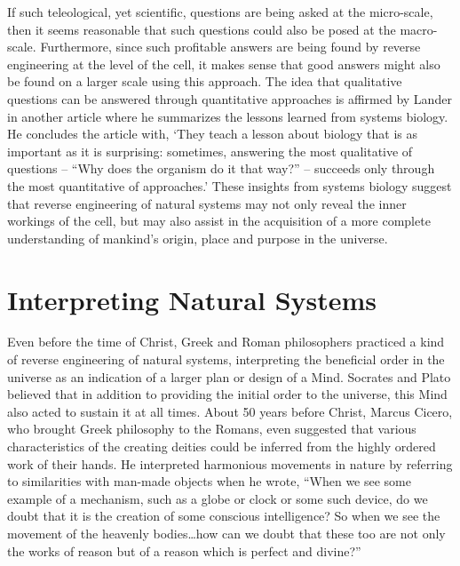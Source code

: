 If such teleological, yet scientific, questions are being asked at the
micro-scale, then it seems reasonable that such questions could also be
posed at the macro-scale. Furthermore, since such profitable answers
are being found by reverse engineering at the level of the cell, it
makes sense that good answers might also be found on a larger scale
using this approach. The idea that qualitative questions can be
answered through quantitative approaches is affirmed by Lander in
another article where he summarizes the lessons learned from systems
biology. He concludes the article with, ‘They teach a lesson about
biology that is as important as it is surprising: sometimes, answering
the most qualitative of questions – “Why does the organism do it that
way?” – succeeds only through the most quantitative of
approaches.’\citep{lander2007} These insights from systems biology
suggest that reverse engineering of natural systems may not only reveal
the inner workings of the cell, but may also assist in the acquisition
of a more complete understanding of mankind’s origin, place and purpose
in the universe.

\section{Interpreting Natural Systems}

Even before the time of Christ, Greek and Roman philosophers practiced a
kind of reverse engineering of natural systems, interpreting the
beneficial order in the universe as an indication of a larger plan or
design of a Mind.\citep{sedley2009} Socrates and Plato believed that
in addition to providing the initial order to the universe, this Mind
also acted to sustain it at all times. About 50 years before Christ,
Marcus Cicero, who brought Greek philosophy to the Romans, even
suggested that various characteristics of the creating deities could be
inferred from the highly ordered work of their hands. He interpreted
harmonious movements in nature by referring to similarities with
man-made objects when he wrote, “When we see some example of a
mechanism, such as a globe or clock or some such device, do we doubt
that it is the creation of some conscious intelligence? So when we see
the movement of the heavenly bodies…how can we doubt that these too are
not only the works of reason but of a reason which is perfect and
divine?”\citep[][pg. 89]{ciceronature}

